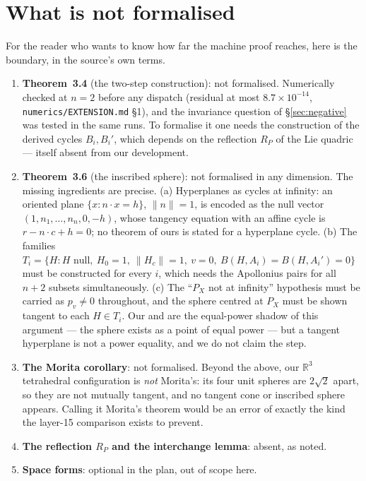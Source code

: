 \documentclass[11pt]{article}
\theoremstyle{definition}
\theoremstyle{remark}
\newcommand{\RR}{\mathbb{R}}
\begin{document}
\section{What is not formalised}\label{sec:not}

For the reader who wants to know how far the machine proof reaches, here is the boundary, in the
source's own terms.

\begin{enumerate}
\item \textbf{Theorem~3.4} (the two-step construction): not formalised. Numerically checked at $n=2$
before any dispatch (residual at most $8.7\times10^{-14}$, \texttt{numerics/EXTENSION.md} \S1), and the
invariance question of \S\ref{sec:negative} was tested in the same runs. To formalise it one needs the construction of the
derived cycles $B_i,B_i'$, which depends on the reflection $R_P$ of the Lie quadric --- itself
absent from our development.
\item \textbf{Theorem~3.6} (the inscribed sphere): not formalised in any dimension. The missing
ingredients are precise. (a) Hyperplanes as cycles at infinity: an oriented plane
$\{x:n\cdot x=h\}$, $\lVert n\rVert=1$, is encoded as the null vector $(1,n_1,\dots,n_n,0,-h)$, whose
tangency equation with an affine cycle is $r-n\cdot c+h=0$; no theorem of ours is stated for a
hyperplane cycle. (b) The families
$T_i=\{H: H\text{ null},\ H_0=1,\ \lVert H_c\rVert=1,\ v=0,\ B(H,A_i)=B(H,A_i')=0\}$ must be
constructed for every $i$, which
needs the Apollonius pairs for all $n+2$ subsets simultaneously. (c) The ``$P_X$ not at infinity''
hypothesis must be carried as $p_v\neq0$ throughout, and the sphere centred at $P_X$ must be shown
tangent to each $H\in T_i$. Our  and
 are the equal-power shadow of this argument --- the sphere exists as a
point of equal power --- but a tangent hyperplane is not a power equality, and we do not claim the
step.
\item \textbf{The Morita corollary}: not formalised. Beyond the above, our $\RR^3$ tetrahedral
configuration is \emph{not} Morita's: its four unit spheres are $2\sqrt2$ apart, so they are not
mutually tangent, and no tangent cone or inscribed sphere appears. Calling it Morita's theorem would
be an error of exactly the kind the layer-15 comparison exists to prevent.
\item \textbf{The reflection $R_P$ and the interchange lemma}: absent, as noted.
\item \textbf{Space forms}: optional in the plan, out of scope here.
\end{enumerate}
\end{document}
